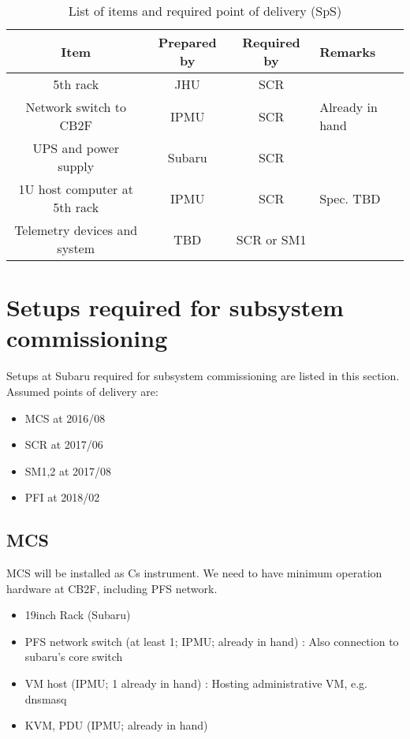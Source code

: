 \documentclass[a4paper,notitlepage]{article}
\begin{document}
\begin{table}[htb]
\caption{List of items and required point of delivery (SpS)}
\label{tbl:listitem-sps}
\begin{center}
\begin{tabular}{c||c|c|l}
Item & Prepared by & Required by & Remarks \\
\hline
5th rack & JHU & SCR &  \\
Network switch to CB2F & IPMU & SCR & Already in hand \\
UPS and power supply & Subaru & SCR &  \\
1U host computer at 5th rack & IPMU & SCR & Spec. TBD \\
Telemetry devices and system & TBD & SCR or SM1 & 
\end{tabular}
\end{center}
\end{table}


\section{Setups required for subsystem commissioning}

Setups at Subaru required for subsystem commissioning are listed in this 
section. Assumed points of delivery are: 
\begin{itemize}
  \item MCS at 2016/08
  \item SCR at 2017/06
  \item SM1,2 at 2017/08
  \item PFI at 2018/02
\end{itemize}

\subsection{MCS}

MCS will be installed as Cs instrument. 
We need to have minimum operation hardware at CB2F, including PFS network.

\begin{itemize}
  \item 19inch Rack (Subaru)
  \item PFS network switch (at least 1; IPMU; already in hand)
    : Also connection to subaru’s core switch
  \item VM host (IPMU; 1 already in hand)
    : Hosting administrative VM, e.g. dnsmasq
  \item KVM, PDU (IPMU; already in hand)
\end{itemize}
\end{document}

